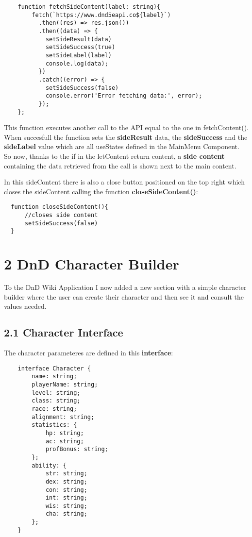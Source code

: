 \documentclass[
]{article}
\begin{document}
\begin{flushleft}
\begin{verbatim}
    function fetchSideContent(label: string){
        fetch(`https://www.dnd5eapi.co${label}`)
          .then((res) => res.json())
          .then((data) => {
            setSideResult(data)
            setSideSuccess(true)
            setSideLabel(label)
            console.log(data);
          })
          .catch((error) => {
            setSideSuccess(false)
            console.error('Error fetching data:', error);
          });
    };
\end{verbatim}

This function executes another call to the API equal to the one in fetchContent().
When succesfull the function sets the \textbf{sideResult} data, the \textbf{sideSuccess} and the \textbf{sideLabel} value which are all useStates defined in the MainMenu Component.
So now, thanks to the if in the letContent return content, a \textbf{side content} containing the data retrieved from the call is shown next to the main content.

In this sideContent there is also a close button positioned on the top right which closes the sideContent calling the function \textbf{closeSideContent()}:

\begin{verbatim}
  function closeSideContent(){
      //closes side content
      setSideSuccess(false)
  }
\end{verbatim}

\newpage
\section{2 DnD Character Builder}\label{builder}

To the DnD Wiki Application I now added a new section with a simple character builder where the user can create their character and then see it and consult the values needed.

\subsection{2.1 Character Interface}\label{interface}

The character parameteres are defined in this \textbf{interface}:

\begin{verbatim}
    interface Character {
        name: string;
        playerName: string;
        level: string;
        class: string;
        race: string;
        alignment: string;
        statistics: {
            hp: string;
            ac: string;
            profBonus: string;
        };
        ability: {
            str: string;
            dex: string;
            con: string;
            int: string;
            wis: string;
            cha: string;
        };
    }
\end{verbatim}


\end{flushleft}
\end{document}

